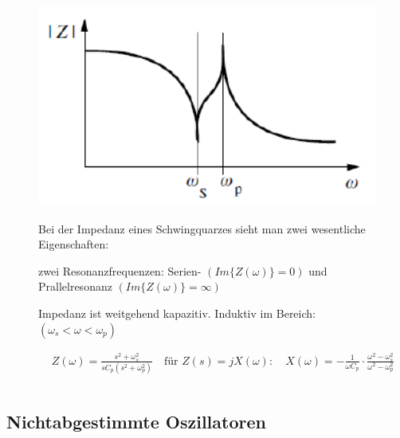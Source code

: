 \begin{figure}[h!]
\begin{minipage}{0.3\textwidth}
	\includegraphics[width=1.0\textwidth]{images/Impedanz(Frequenz)_Schwingquarz}
	\end{minipage}
	\begin{minipage}{0.6\textwidth}
      \vspace{0.5cm}
      Bei der Impedanz eines Schwingquarzes sieht man zwei wesentliche Eigenschaften:
      \begin{compactitem}
        \item zwei Resonanzfrequenzen: Serien- $(Im\{Z(\omega)\}=0)$ und Prallelresonanz $(Im\{Z(\omega)\}=\infty)$
        \item Impedanz ist weitgehend kapazitiv. Induktiv im Bereich:\\ $(\omega_s < \omega < \omega_p)$\\
      \end{compactitem}
      \begin{equation*} 
        \begin{split} 
         & Z (\omega)=\frac{s^2+\omega _s ^2}{sC_p(s^2+\omega_p ^2)} \quad \text{für } Z(s) = jX(\omega): \quad X(\omega)=-\frac{1}{\omega C_p}\cdot \frac{\omega^2-\omega_s ^2}{\omega^2-\omega_p ^2}\\\\
        \end{split} 
      \end{equation*}
	\end{minipage}
\end{figure}

\FloatBarrier
\subsection{Nichtabgestimmte Oszillatoren }
